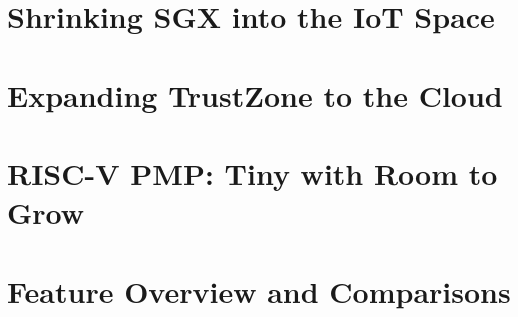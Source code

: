 \section{Shrinking SGX into the IoT Space}
\section{Expanding TrustZone to the Cloud}
\section{RISC-V PMP: Tiny with Room to Grow}
\section{Feature Overview and Comparisons}